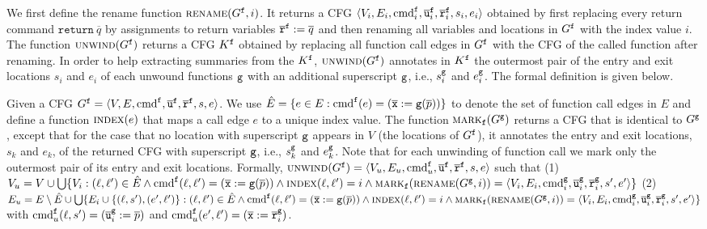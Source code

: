 We first define the rename function $\textsc{rename}(G^{\mathtt{{f}}},i)$. It returns a CFG $\langle V_i, E_i,\textmd{cmd}_i^{\mathtt{{f}}}, \overline{\texttt{u}}_i^{\mathtt{{f}}}, \overline{\texttt{r}}_i^{\mathtt{{f}}},s_i,e_i \rangle$ obtained by first replacing every return command $\mathtt{return}\ \overline{q}$ by assignments to return variables $\overline{\texttt{r}}^{\mathtt{{f}}} := \overline{q}$ and then renaming all variables and locations in $G^{\mathtt{{f}}}$ with the index value $i$. The function $\textsc{unwind}(G^{\mathtt{{f}}})$ returns a CFG $K^{\mathtt{{f}}}$ obtained by replacing all function call edges in $G^{\mathtt{{f}}}$ with the CFG of the called function after renaming. In order to help extracting summaries from the $K^{\mathtt{{f}}}$, $\textsc{unwind}(G^{\mathtt{{f}}})$ annotates in $K^{\mathtt{{f}}}$ the outermost pair of the entry and exit locations ${s_i}$ and ${e_i}$ of each unwound functions $\mathtt{{g}}$ with an additional superscript $\mathtt{{g}}$, i.e., $s_i^{\mathtt{{g}}}$ and $e_i^{\mathtt{{g}}}$. The formal definition is given below.

Given a CFG $G^{\mathtt{{f}}}=\langle
V, E,\textmd{cmd}^{\mathtt{{f}}}, \overline{\texttt{u}}^{\mathtt{{f}}}, \overline{\texttt{r}}^{\mathtt{{f}}},s,e \rangle$.
We use $\hat{E} =\{e\in E: \textmd{cmd}^{\mathtt{{f}}} (e)= (\overline{\texttt{x}}:=\mathtt{g}(\overline{p}))\}$ to denote the set of function call edges in $E$ and define a function $\textsc{index}(e)$ that maps a call edge $e$ to a unique index value.
The function $\textsc{mark}_{\mathtt{{f}}}(G^{\mathtt{{g}}})$ returns a CFG that is identical to $G^{\mathtt{{g}}}$, except that for the case that no location with superscript $\mathtt{{g}}$ appears in $V$ (the locations of $G^{\mathtt{{f}}}$), it annotates the entry and exit locations, $s_k$ and $e_k$, of the returned CFG with superscript $\mathtt{{g}}$, i.e., $s_k^{\mathtt{{g}}}$ and $e_k^{\mathtt{{g}}}$. Note that for each unwinding of function call we mark only the outermost pair of its entry and exit locations.
Formally, $\textsc{unwind}(G^{\mathtt{{f}}}) = \langle V_u, E_u,\textmd{cmd}_u^{\mathtt{{f}}}, \overline{\texttt{u}}^{\mathtt{{f}}}, \overline{\texttt{r}}^{\mathtt{{f}}},s,e \rangle$ such that 
(1) $V_u = V\cup \bigcup\{V_i:(\ell, \ell')\in \hat{E} \wedge \textmd{cmd}^{\mathtt{{f}}}(\ell, \ell')=(\overline{\texttt{x}}:=\mathtt{g}(\overline{p}))\wedge \textsc{index}(\ell, \ell')=i \wedge 
\textsc{mark}_{\mathtt{{f}}}(\textsc{rename}(G^{\mathtt{{g}}},i))=
\langle V_i, E_i,\textmd{cmd}^{\mathtt{{g}}}_i, \overline{\texttt{u}}^{\mathtt{{g}}}_i, \overline{\texttt{r}}^{\mathtt{{g}}}_i,s',e'\rangle \}$ 
(2) $E_u= E \setminus \hat{E} \cup \bigcup\{E_i\cup\{(\ell, s'),(e', \ell')\}: (\ell, \ell')\in \hat{E} \wedge 
\textmd{cmd}^{\mathtt{{f}}}(\ell, \ell')=(\overline{\texttt{x}}:=\mathtt{g}(\overline{p}))\wedge \textsc{index}(\ell, \ell')=i \wedge 
\textsc{mark}_{\mathtt{{f}}}(\textsc{rename}(G^{\mathtt{{g}}},i))=
\langle V_i, E_i,\textmd{cmd}^{\mathtt{{g}}}_i, \overline{\texttt{u}}^{\mathtt{{g}}}_i, \overline{\texttt{r}}^{\mathtt{{g}}}_i,s',e'\rangle \}$ with $\textmd{cmd}_u^{\mathtt{{f}}} (\ell, s') = (\overline{\texttt{u}}_i^{\mathtt{{g}}}:=\overline{p})$ and $\textmd{cmd}_u^{\mathtt{{f}}} (e', \ell') = (\overline{\texttt{x}}:=\overline{\texttt{r}}^{\mathtt{{g}}}_i)$.


